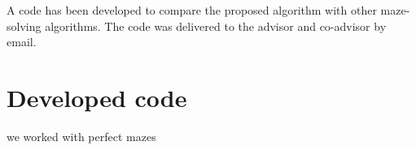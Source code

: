 A code has been developed to compare the proposed algorithm with other maze-solving algorithms. The code was delivered to the advisor and co-advisor by email.

\section{Developed code}

we worked with perfect mazes